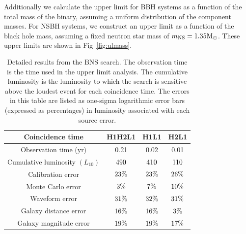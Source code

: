 Additionally we calculate the upper limit for BBH systems
as a function of the total mass of the binary, assuming a uniform
distribution of the component masses.  For \ac{NSBH} systems, we
construct an upper limit as a function of the black hole mass, assuming
a fixed neutron star mass of $m_{\mathrm{NS}} = 1.35
\mathrm{M_\odot}$.  These upper limits are shown in Fig~\ref{fig:ulmass}.

%
\begin{table}[t]
\center
\begin{tabular}{c | c | c | c}
\hline \hline
\multicolumn{1}{m{5cm}|}{\centering Coincidence time} & H1H2L1 & H1L1 & H2L1 \\
\hline
\multicolumn{1}{m{5cm}|}{\centering Observation time (yr)} & 0.21 & 0.02 & 0.01 \\
\hline
\multicolumn{1}{m{5cm}|}{\centering Cumulative luminosity $\left({L_{10}}\right)$} & $490$ & $410$ & $110$ \\
\hline
\multicolumn{1}{m{5cm}|}{\centering Calibration error} & $23\%$ & $23\%$ & $26\%$ \\
\hline
\multicolumn{1}{m{5cm}|}{\centering Monte Carlo error} & $3\%$ & $7\%$ & $10\%$ \\
\hline
\multicolumn{1}{m{5cm}|}{\centering Waveform error} & $31\%$ & $32\%$ & $31\%$ \\
\hline
\multicolumn{1}{m{5cm}|}{\centering Galaxy distance error} & $16\%$ & $16\%$ & $3\%$ \\
\hline
\multicolumn{1}{m{5cm}|}{\centering Galaxy magnitude error} & $19\%$ & $19\%$ & $17\%$ \\
\hline
\hline
\end{tabular}
\caption{Detailed results from the BNS search.  The observation
time is the time used in the upper limit analysis.  The cumulative
luminosity is the luminosity to which the search is sensitive above the
loudest event for each coincidence time.  The errors in this table are
listed as one-sigma logarithmic error bars (expressed as percentages) in
luminosity associated with each source error.}
\label{tab:bns}
\end{table}


